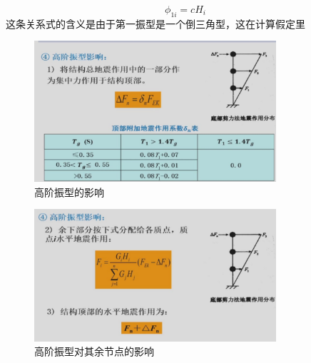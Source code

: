 \documentclass[12pt, a4paper, oneside, UTF8]{ctexbook}
\begin{document}
\begin{remark}
    \[\phi_{1i} = cH_i\]
    这条关系式的含义是由于第一振型是一个倒三角型，这在计算假定里
\end{remark}

\begin{figure}[H]
    \centering
    \includegraphics[width=0.8\textwidth]{../figure/gaojiezhengxing.png}
    \caption{高阶振型的影响}
\end{figure}

\begin{figure}[H]
    \centering
    \includegraphics[width=0.8\textwidth]{../figure/gaojiezhengxing2.png}
    \caption{高阶振型对其余节点的影响}
\end{figure}
\end{document}
